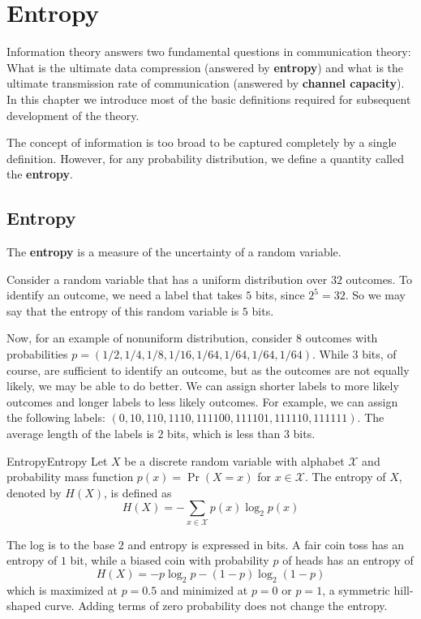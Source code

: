 \documentclass[../main.tex]{subfiles}
\begin{document}
\chapter{Entropy}

Information theory answers two fundamental questions in communication theory: What is the ultimate data compression (answered by \textbf{entropy}) and what is the ultimate transmission rate of communication (answered by \textbf{channel capacity}). In this chapter we introduce most of the basic definitions required for subsequent development of the theory.

The concept of information is too broad to be captured completely by a single definition. However, for any probability distribution, we define a quantity called the \textbf{entropy}.

\section{Entropy}
The \textbf{entropy} is a measure of the uncertainty of a random variable.

\begin{example}{}{}
  Consider a random variable that has a uniform distribution over $32$ outcomes. To identify an outcome, we need a label that takes $5$ bits, since $2^5 = 32$. So we may say that the entropy of this random variable is $5$ bits.

  \medskip
  Now, for an example of nonuniform distribution, consider $8$ outcomes with probabilities $p = (1/2, 1/4, 1/8, 1/16, 1/64, 1/64, 1/64, 1/64)$. While $3$ bits, of course, are sufficient to identify an outcome, but as the outcomes are not equally likely, we may be able to do better. We can assign shorter labels to more likely outcomes and longer labels to less likely outcomes. For example, we can assign the following labels: $(0, 10, 110, 1110, 111100, 111101, 111110, 111111)$. The average length of the labels is $2$ bits, which is less than $3$ bits.
\end{example}

\begin{definition}{Entropy}{Entropy}
  Let $X$ be a discrete random variable with alphabet $\mathcal{X}$ and probability mass function $p(x) = \Pr(X=x)$ for $x \in \mathcal{X}$. The entropy of $X$, denoted by $H(X)$, is defined as
  \begin{equation}
    H(X) = -\sum_{x \in \mathcal{X}} p(x) \log_2 p(x)
  \end{equation}
\end{definition}
The log is to the base $2$ and entropy is expressed in bits. A fair coin toss has an entropy of $1$ bit, while a biased coin with probability $p$ of heads has an entropy of
\begin{equation*}
  H(X) = -p \log_2 p - (1-p) \log_2 (1-p)
\end{equation*}
which is maximized at $p=0.5$ and minimized at $p=0$ or $p=1$, a symmetric hill-shaped curve. Adding terms of zero probability does not change the entropy.
\end{document}
